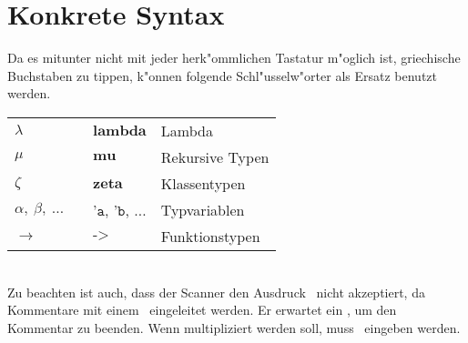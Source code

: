 \section{Konkrete Syntax}
Da es mitunter nicht mit jeder herk"ommlichen Tastatur m"oglich ist, griechische Buchstaben zu tippen,
k"onnen folgende Schl"usselw"orter als Ersatz benutzt werden.\\[5mm]
\begin{tabular}{lll}
  \mbox{$\lambda$}                          & $\textbf{lambda}$                        & Lambda\\
  \mbox{$\mu$}                              & $\textbf{mu}$                            & Rekursive Typen\\
  \mbox{$\zeta$}                            & $\textbf{zeta}$                          & Klassentypen\\
  \mbox{$\alpha,\ \beta,\ \ldots \quad$}    & $\texttt{'a}$, $\texttt{'b}$, $\ldots$   & Typvariablen\\
  \mbox{$\to$}                              & $\texttt{->}$                            & Funktionstypen\\
\end{tabular}\\[5mm]
Zu beachten ist auch, dass der Scanner den Ausdruck \grqq\ nicht akzeptiert,
da Kommentare mit einem \glqq{\bf (*}\grqq\ eingeleitet werden. Er erwartet ein \glqq{\bf *)}\grqq,
um den Kommentar zu beenden. Wenn multipliziert werden soll, muss \grqq\ eingeben werden.


